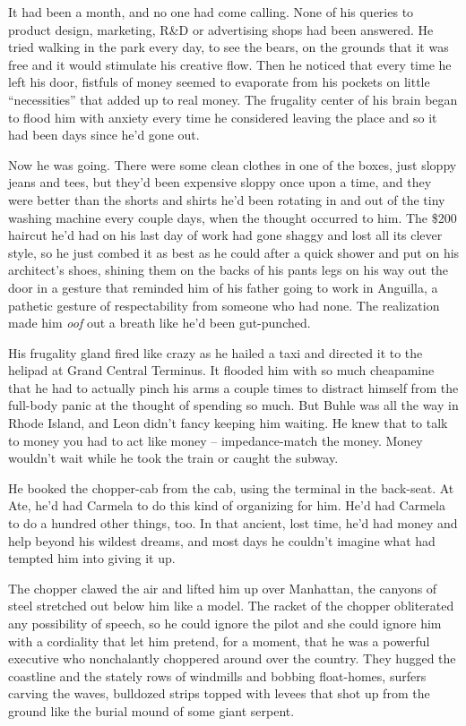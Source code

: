It had been a month, and no one had come calling. None of his queries 
to product design, marketing, R{\&}D or advertising shops had been 
answered. He tried walking in the park every day, to see the bears, on 
the grounds that it was free and it would stimulate his creative flow. 
Then he noticed that every time he left his door, fistfuls of money 
seemed to evaporate from his pockets on little “necessities” that 
added up to real money. The frugality center of his brain began to 
flood him with anxiety every time he considered leaving the place and 
so it had been days since he'd gone out.

Now he was going. There were some clean clothes in one of the boxes, 
just sloppy jeans and tees, but they'd been expensive sloppy once upon 
a time, and they were better than the shorts and shirts he'd been 
rotating in and out of the tiny washing machine every couple days, when 
the thought occurred to him. The \$200 haircut he'd had on his last day 
of work had gone shaggy and lost all its clever style, so he just 
combed it as best as he could after a quick shower and put on his 
architect's shoes, shining them on the backs of his pants legs on his 
way out the door in a gesture that reminded him of his father going to 
work in Anguilla, a pathetic gesture of respectability from someone who 
had none. The realization made him \emph{oof} out a breath like he'd 
been gut-punched.

His frugality gland fired like crazy as he hailed a taxi and directed 
it to the helipad at Grand Central Terminus. It flooded him with so 
much cheapamine that he had to actually pinch his arms a couple times 
to distract himself from the full-body panic at the thought of spending 
so much. But Buhle was all the way in Rhode Island, and Leon didn't 
fancy keeping him waiting. He knew that to talk to money you had to act 
like money -- impedance-match the money. Money wouldn't wait while he 
took the train or caught the subway.

He booked the chopper-cab from the cab, using the terminal in the 
back-seat. At Ate, he'd had Carmela to do this kind of organizing for 
him. He'd had Carmela to do a hundred other things, too. In that 
ancient, lost time, he'd had money and help beyond his wildest dreams, 
and most days he couldn't imagine what had tempted him into giving it 
up.

The chopper clawed the air and lifted him up over Manhattan, the 
canyons of steel stretched out below him like a model. The racket of 
the chopper obliterated any possibility of speech, so he could ignore 
the pilot and she could ignore him with a cordiality that let him 
pretend, for a moment, that he was a powerful executive who 
nonchalantly choppered around over the country. They hugged the 
coastline and the stately rows of windmills and bobbing float-homes, 
surfers carving the waves, bulldozed strips topped with levees that 
shot up from the ground like the burial mound of some giant serpent.

